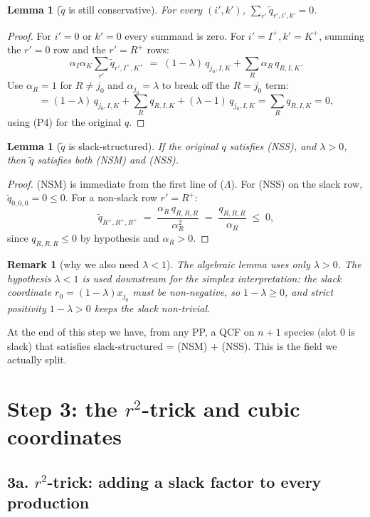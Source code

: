 \documentclass[11pt]{article}
\newtheorem{lemma}[theorem]{Lemma}
\newtheorem{remark}[theorem]{Remark}
\begin{document}
\begin{lemma}[$\widetilde q$ is still conservative]
\label{lem:lift-cons}
For every $(i',k')$, $\sum_{r'} \widetilde q_{r', i', k'} = 0$.
\end{lemma}
\begin{proof}
For $i' = 0$ or $k' = 0$ every summand is zero.
For $i' = I^+, k' = K^+$, summing the $r' = 0$ row and the $r' = R^+$ rows:
\[
\alpha_I \alpha_K \sum_{r'} \widetilde q_{r', I^+, K^+}
  \;=\; (1-\lambda)\, q_{j_0, I, K} + \sum_R \alpha_R\, q_{R, I, K}.
\]
Use $\alpha_R = 1$ for $R \ne j_0$ and $\alpha_{j_0} = \lambda$ to break
off the $R = j_0$ term:
\[
  = (1-\lambda)\, q_{j_0, I, K} + \sum_{R} q_{R, I, K} + (\lambda - 1)\, q_{j_0, I, K}
  = \sum_R q_{R, I, K} = 0,
\]
using (P4) for the original $q$.
\end{proof}

\begin{lemma}[$\widetilde q$ is slack-structured]
\label{lem:lift-slack}
If the original $q$ satisfies (NSS), and $\lambda > 0$, then
$\widetilde q$ satisfies both (NSM) and (NSS).
\end{lemma}
\begin{proof}
(NSM) is immediate from the first line of ($\Lambda$).
For (NSS) on the slack row, $\widetilde q_{0,0,0} = 0 \le 0$.
For a non-slack row $r' = R^+$:
\[
\widetilde q_{R^+, R^+, R^+} \;=\; \frac{\alpha_R\, q_{R,R,R}}{\alpha_R^2}
   \;=\; \frac{q_{R,R,R}}{\alpha_R} \;\le\; 0,
\]
since $q_{R,R,R} \le 0$ by hypothesis and $\alpha_R > 0$.
\end{proof}

\begin{remark}[why we also need $\lambda < 1$]
The algebraic lemma uses only $\lambda > 0$. The hypothesis
$\lambda < 1$ is used downstream for the simplex interpretation: the
slack coordinate $r_0 = (1-\lambda) x_{j_0}$ must be non-negative, so
$1 - \lambda \ge 0$, and strict positivity $1 - \lambda > 0$ keeps the
slack non-trivial.
\end{remark}

At the end of this step we have, from any PP, a QCF on $n+1$ species
(slot $0$ is slack) that satisfies slack-structured = (NSM) + (NSS).
This is the field we actually split.

\section{Step 3: the $r^2$-trick and cubic coordinates}

\subsection*{3a. $r^2$-trick: adding a slack factor to every production}
\end{document}
